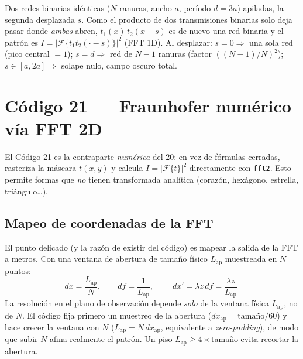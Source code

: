 \documentclass[11pt,a4paper]{article}
\newcommand{\Fou}{\mathcal{F}}
\begin{document}
\begin{description}[leftmargin=1.2em,style=nextline]
\item[\textbf{9. Redes en cascada (pto 6).}]
Dos redes binarias idénticas ($N$ ranuras, ancho $a$, período $d=3a$) apiladas,
la segunda desplazada $s$. Como el producto de dos transmisiones binarias solo
deja pasar donde \emph{ambas} abren, $t_1(x)\,t_2(x-s)$ es de nuevo una red
binaria y el patrón es $I=|\Fou\{t_1 t_2(\cdot-s)\}|^2$ (FFT 1D). Al desplazar:
$s=0\Rightarrow$ una sola red (pico central $=1$); $s=d\Rightarrow$ red de $N-1$
ranuras (factor $((N-1)/N)^2$); $s\in[a,2a]\Rightarrow$ solape nulo, campo oscuro
total.

\end{description}

\section{Código 21 --- Fraunhofer numérico vía FFT 2D}

El Código 21 es la contraparte \emph{numérica} del 20: en vez de fórmulas
cerradas, rasteriza la máscara $t(x,y)$ y calcula
$I=|\Fou\{t\}|^2$ directamente con \texttt{fft2}. Esto permite formas que
\emph{no} tienen transformada analítica (corazón, hexágono, estrella,
triángulo\dots).

\subsection{Mapeo de coordenadas de la FFT}
El punto delicado (y la razón de existir del código) es mapear la salida de la FFT
a metros. Con una ventana de abertura de tamaño físico $L_\text{ap}$ muestreada en
$N$ puntos:
\begin{equation}
dx = \frac{L_\text{ap}}{N},\qquad
df = \frac{1}{L_\text{ap}},\qquad
\boxed{\;dx' = \lambda z\, df = \frac{\lambda z}{L_\text{ap}}\;}
\end{equation}
La resolución en el plano de observación depende \emph{solo} de la ventana física
$L_\text{ap}$, no de $N$. El código fija primero un muestreo de la abertura
($dx_\text{ap}=\text{tamaño}/60$) y hace crecer la ventana con $N$
($L_\text{ap}=N\,dx_\text{ap}$, equivalente a \emph{zero-padding}), de modo que
subir $N$ afina realmente el patrón. Un piso $L_\text{ap}\ge 4\times$tamaño evita
recortar la abertura.
\end{document}
